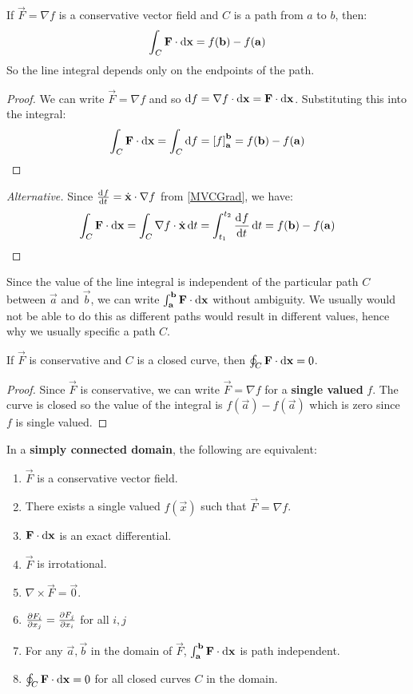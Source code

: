\documentclass[../main.tex]{subfiles}
\begin{document}
\begin{proposition}
  If $\vec{F} = \nabla f$ is a conservative vector field and $C$ is a path from $a$ to $b$, then:
  \[
    \int_{C} \vec{F} \cdot \d{\vec{x}} = f(\vec{b}) - f(\vec{a})
  \]
  So the line integral depends only on the endpoints of the path.
\end{proposition}
\begin{proof}
  We can write $\vec{F} = \nabla f$ and so $\d{f} = \nabla f \cdot \d{\vec{x}} = \vec{F} \cdot \d{\vec{x}}$.
  Substituting this into the integral:
  \[
    \int_{C} \vec{F} \cdot \d{\vec{x}} = \int_{C} \d{f} = \eval{f}{\vec{a}}{\vec{b}} = f(\vec{b}) - f(\vec{a})
  \]
\end{proof}
\begin{proof}[Alternative]
Since $\deriv{f}{t} = \dot{\vec{x}} \cdot \nabla f$ from \cref{MVCGrad}, we have:
\[
\int_{C} \vec{F} \cdot \d{\vec{x}} = \int_{C} \nabla f \cdot \dot{\vec{x}} \d{t} = \int_{t_1}^{t_2} \deriv{f}{t} \d{t} = f(\vec{b}) - f(\vec{a})
\]
\end{proof}
\begin{remark}[Notation]
  Since the value of the line integral is independent of the particular path $C$ between $\vec{a}$ and $\vec{b}$, we can write  $\int_{\vec{a}}^{\vec{b}} \vec{F} \cdot \d{\vec{x}}$ without ambiguity.
  We usually would not be able to do this as different paths would result in different values, hence why we usually specific a path $C$.
\end{remark}
\begin{corollary}
  If $\vec{F}$ is conservative and $C$ is a closed curve, then $\oint_C \vec{F} \cdot \d{\vec{x}} = 0$.
\end{corollary}
\begin{proof}
  Since $\vec{F}$ is conservative, we can write $\vec{F} = \nabla f$ for a \textbf{single valued} $f$.
  The curve is closed so the value of the integral is $f(\vec{a}) - f(\vec{a})$ which is zero since $f$ is single valued.
\end{proof}
\begin{proposition}
  In a \textbf{simply connected domain}, the following are equivalent:
  \begin{enumerate}
    \item $\vec{F}$ is a conservative vector field.
    \item There exists a single valued $f(\vec{x})$ such that $\vec{F} = \nabla f$.
    \item $\vec{F} \cdot \d{\vec{x}}$ is an exact differential.
    \item $\vec{F}$ is irrotational.
    \item $\nabla \times \vec{F} = \vec{0}$.
    \item $\pderiv{F_i}{x_j} = \pderiv{F_j}{x_i}$ for all $i, j$
    \item For any $\vec{a}, \vec{b}$ in the domain of $\vec{F}$, $\int_{\vec{a}}^{\vec{b}} \vec{F} \cdot \d{\vec{x}}$ is path independent.
    \item $\oint_C \vec{F} \cdot \d{\vec{x}} = 0$ for all closed curves $C$ in the domain.
  \end{enumerate}
\end{proposition}
\end{document}
